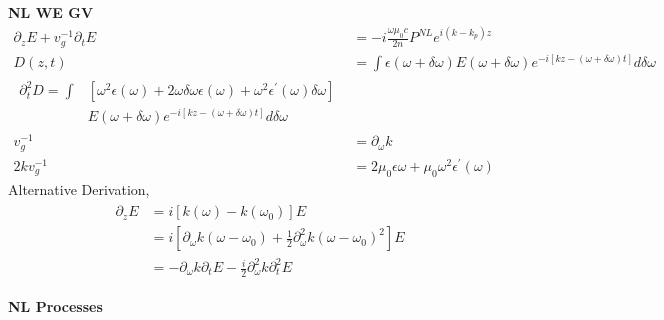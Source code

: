 \documentclass[12pt]{article}
\begin{document}
\pagebreak

\begin{multicols}{2}
  
  \textbf{NL WE GV}
  \begin{align}
      \partial_z E + v_g^{-1} \partial_t E &= -i \frac{\omega \mu_0 c}{2n} P^{NL} e^{i(k - k_p) z}\\
    D(z, t) &= \int \epsilon(\omega + \delta \omega) E(\omega + \delta \omega)
    e^{-i[kz - (\omega + \delta \omega)t]} d\delta\omega\\
    \begin{split}
      \partial_t^2 D = \int &[\omega^2 {}\epsilon(\omega) + 2 \omega \delta\omega \epsilon(\omega)
        + \omega^2 \epsilon^{\prime}(\omega) \delta\omega]\\
      &E(\omega + \delta\omega)
      e^{-i[kz - (\omega + \delta \omega)t]} d\delta\omega
    \end{split}\\
    v_g^{-1} &= \partial_\omega k\\
    2kv_g^{-1} &= 2\mu_0 \epsilon \omega + \mu_0 \omega^2 \epsilon^{\prime}(\omega)
  \end{align}
  Alternative Derivation,
  \begin{align}
    \begin{split}
      \partial_z E &= i[k(\omega) - k(\omega_0)] E\\
      &= i[\partial_{\omega} k (\omega - \omega_0) + \frac{1}{2}\partial_{\omega}^2 k (\omega - \omega_0)^2] E\\
      &= -\partial_{\omega} k \partial_t E - \frac{i}{2}\partial_{\omega}^2 k \partial^2_t E
    \end{split}
  \end{align}

  \textbf{NL Processes}
  

\end{multicols}
\end{document}
